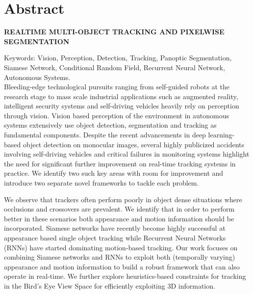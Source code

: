 \chapter*{Abstract}

\begin{center}
	\vspace{5mm}
	\MakeUppercase{\textbf{Realtime Multi-Object Tracking and Pixelwise Segmentation}}
\end{center}

\noindent Keywords: Vision, Perception, Detection, Tracking, Panoptic Segmentation, Siamese Network, Conditional Random Field, Recurrent Neural Network, Autonomous Systems. \\

Bleeding-edge technological pursuits ranging from self-guided robots at the research stage to mass scale industrial applications such as augmented reality, intelligent security systems and self-driving vehicles heavily rely on perception through vision. Vision based perception of the environment in autonomous systems extensively use object detection, segmentation and tracking as fundamental components. Despite the recent advancements in deep learning-based object detection on monocular images, several highly publicized accidents involving self-driving vehicles and critical failures in monitoring systems highlight the need for significant further improvement on real-time tracking systems in practice. We identify two such key areas with room for improvement and introduce two separate novel frameworks to tackle each problem. 

We observe that trackers often perform poorly in object dense situations where occlusions and crossovers are prevalent. We identify that in order to perform better in these scenarios both appearance and motion information should be incorporated. Siamese networks have recently become highly successful at appearance based single object tracking while Recurrent Neural Networks (RNNs) have started dominating motion-based tracking. Our work focuses on combining Siamese networks and RNNs to exploit both (temporally varying) appearance and motion information to build a robust framework that can also operate in real-time. We further explore heuristics-based constraints for tracking in the Bird’s Eye View Space for efficiently exploiting 3D information.

